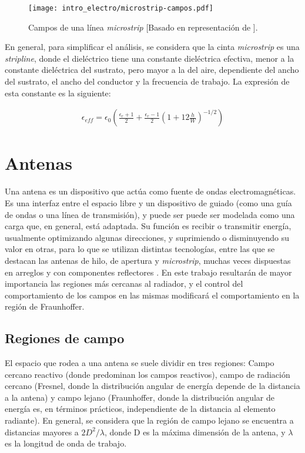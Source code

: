 \begin{figure}[htp]
	\centering
	\texttt{[image: intro\_electro/microstrip-campos.pdf]}
	\caption{Campos de una línea \textit{microstrip} [Basado en representación de \cite{Pozar:MwEngineering}].}
	\label{fig:microstrip-campos}
\end{figure}

En general, para simplificar el análisis, se considera que la cinta \textit{microstrip} es una \textit{stripline}, donde el dieléctrico tiene una constante dieléctrica efectiva, menor a la constante dieléctrica del sustrato, pero mayor a la del aire, dependiente del ancho del sustrato, el ancho del conductor y la frecuencia de trabajo. La expresión de esta constante es la siguiente:

\begin{align}
	\epsilon_{eff} = \epsilon_0 \left(\frac{\epsilon_r+1}{2} + \frac{\epsilon_r-1}{2} \left( 1+12 \frac{h}{W} \right)^{-1/2} \right)
	\label{eq:cte-diel-efectiva-microstrip}
\end{align}

\section{Antenas}
\label{subsec_antenas}

Una antena es un dispositivo que actúa como fuente de ondas electromagnéticas. Es una interfaz entre el espacio libre y un dispositivo de guiado (como una guía de ondas o una línea de transmisión), y puede ser puede ser modelada como una carga que, en general, está adaptada. Su función es recibir o transmitir energía, usualmente optimizando algunas direcciones, y suprimiendo o disminuyendo su valor en otras, para lo que se utilizan distintas tecnologías, entre las que se destacan las antenas de hilo, de apertura y \textit{microstrip}, muchas veces dispuestas en arreglos y con componentes reflectores \cite{Balanis:Theory}. En este trabajo resultarán de mayor importancia las regiones más cercanas al radiador, y el control del comportamiento de los campos en las mismas modificará el comportamiento en la región de Fraunhoffer.

\subsection{Regiones de campo}
\label{subsubsec_regiones_de_campo}
El espacio que rodea a una antena se suele dividir en tres regiones: Campo cercano reactivo (donde predominan los campos reactivos), campo de radiación cercano (Fresnel, donde la distribución angular de energía depende de la distancia a la antena) y campo lejano (Fraunhoffer, donde la distribución angular de energía es, en términos prácticos, independiente de la distancia al elemento radiante). En general, se considera que la región de campo lejano se encuentra a distancias mayores a $2D^2/\lambda$, donde D es la máxima dimensión de la antena, y $\lambda$ es la longitud de onda de trabajo.

